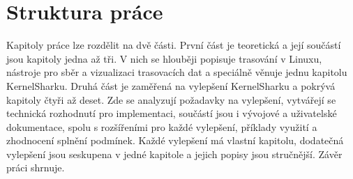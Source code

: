 \section*{Struktura práce}
Kapitoly práce lze rozdělit na dvě části. První část je teoretická a její součástí jsou kapitoly jedna až tři. V nich se hlouběji popisuje trasování v Linuxu, nástroje pro sběr a vizualizaci trasovacích dat a speciálně věnuje jednu kapitolu KernelSharku. Druhá část je zaměřená na vylepšení KernelSharku a pokrývá kapitoly čtyři až deset. Zde se analyzují požadavky na vylepšení, vytvářejí se technická rozhodnutí pro implementaci, součástí jsou i vývojové a uživatelské dokumentace, spolu s rozšířeními pro každé vylepšení, příklady využití a zhodnocení splnění podmínek. Každé vylepšení má vlastní kapitolu, dodatečná vylepšení jsou seskupena v jedné kapitole a jejich popisy jsou stručnější. Závěr práci shrnuje.